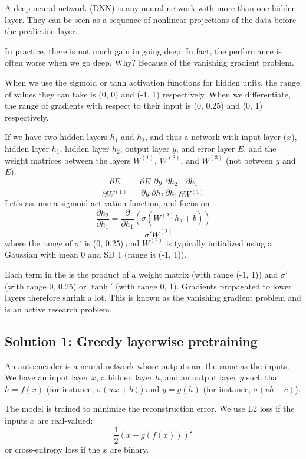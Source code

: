 \documentclass[a4paper,12pt]{article}
\begin{document}
A deep neural network (DNN) is any neural network with more than one hidden layer. They can be seen as a sequence of nonlinear projections of the data before the prediction layer. 

In practice, there is not much gain in going deep. In fact, the performance is often worse when we go deep. Why? Because of the vanishing gradient problem. 

When we use the sigmoid or tanh activation functions for hidden units, the range of values they can take is (0, 0) and (-1, 1) respectively. When we differentiate, the range of gradients with respect to their input is (0, 0.25) and (0, 1) respectively. 

If we have two hidden layers $h_1$ and $h_2$, and thus a network with input layer ($x$), hidden layer $h_1$, hidden layer $h_2$, output layer $y$, and error layer $E$, and the weight matrices between the layers $W^{(1)}$, $W^{(2)}$, and $W^{(3)}$ (not between $y$ and $E$). 
$$\frac{\partial E}{\partial W^{(1)}} = \frac{\partial E}{\partial y} \frac{\partial y}{\partial h_2} \frac{\partial h_2}{\partial h_1} \frac{\partial h_1}{\partial W^{(1)}}$$
Let's assume a sigmoid activation function, and focus on
$$\frac{\partial h_2}{\partial h_1} = \frac{\partial}{\partial h_1}(\sigma(W^{(2)}h_2 + b))$$
$$= \sigma'W^{(2)}$$
where the range of $\sigma'$ is (0, 0.25) and $W^{(2)}$ is typically initialized using a Gaussian with mean 0 and SD 1 (range is (-1, 1)). 

Each term in the is the product of a weight matrix (with range (-1, 1)) and $\sigma'$ (with range 0, 0.25) or $\tanh'$ (with range 0, 1). Gradients propagated to lower layers therefore shrink a lot. This is known as the vanishing gradient problem and is an active research problem. 

\subsection{Solution 1: Greedy layerwise pretraining}

An autoencoder is a neural network whose outputs are the same as the inputs. We have an input layer $x$, a hidden layer $h$, and an output layer $y$ such that $h=f(x)$ (for instance, $\sigma(wx+b)$) and $y=g(h)$ (for instance, $\sigma(vh+c)$). 

The model is trained to minimize the reconstruction error. We use L2 loss if the inputs $x$ are real-valued: 
$$\frac{1}{2}(x-g(f(x)))^2$$
or cross-entropy loss if the $x$ are binary. 
\end{document}
